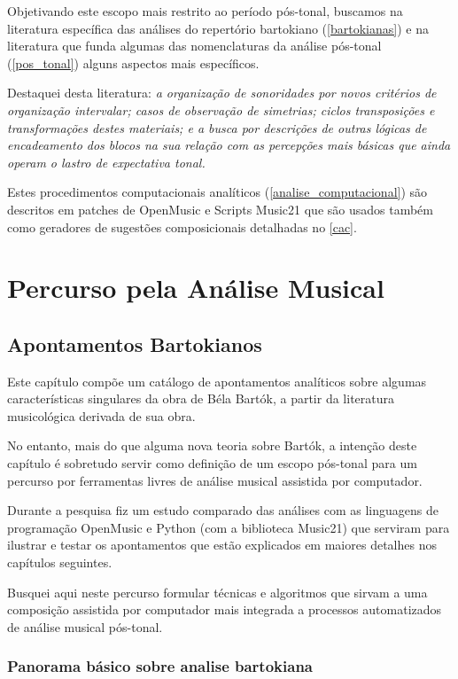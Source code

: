 \documentclass[
	12pt,				%
	openright,			%
	twoside,			%
	a4paper,			%
	english,			%
	french,				%
	spanish,			%
	brazil				%
	]{abntex2}
\begin{document}
Objetivando este escopo mais restrito ao período pós-tonal, buscamos na literatura específica das análises do repertório bartokiano (\autoref{bartokianas}) e na literatura que funda algumas das nomenclaturas da análise pós-tonal (\autoref{pos_tonal}) alguns aspectos mais específicos. 

Destaquei desta literatura: \textit{a organização de sonoridades por novos critérios de organização intervalar; casos de observação de simetrias; ciclos transposições e transformações destes materiais; e a busca por descrições de outras lógicas de encadeamento dos blocos na sua relação com as percepções mais básicas que ainda operam o lastro de expectativa tonal.} 

Estes procedimentos computacionais analíticos (\autoref{analise_computacional}) são descritos em patches de OpenMusic e Scripts Music21 que são usados também como geradores de sugestões composicionais detalhadas no \autoref{cac}.



\part{Percurso pela Análise Musical }


\chapter{Apontamentos Bartokianos}
\label{bartokianas}

Este capítulo compõe um catálogo de apontamentos analíticos sobre algumas características singulares da obra de Béla Bartók, a partir da literatura musicológica derivada de sua obra.

No entanto, mais do que alguma nova teoria sobre Bartók, a intenção deste capítulo é sobretudo servir como definição de um escopo pós-tonal para um percurso por ferramentas livres de análise musical assistida por computador.

Durante a pesquisa fiz um estudo comparado das análises com as linguagens de programação OpenMusic e Python (com a biblioteca Music21)  que serviram para ilustrar e testar os apontamentos que estão explicados em maiores detalhes nos capítulos seguintes.

Busquei aqui neste percurso formular técnicas e algoritmos que sirvam a uma composição assistida por computador mais integrada a processos automatizados de análise musical pós-tonal.


\section{Panorama básico sobre analise bartokiana}
\end{document}

